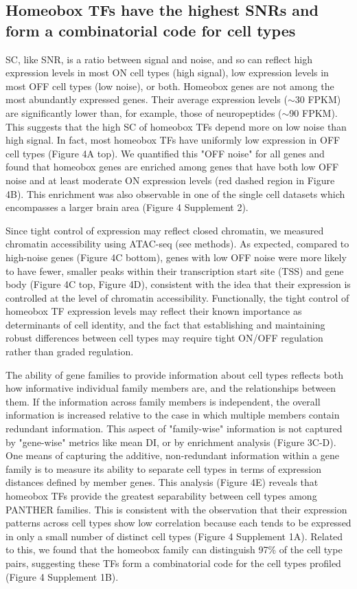 \subsection{Homeobox TFs have the highest SNRs and form a combinatorial code for cell types}
SC, like SNR, is a ratio between signal and noise, and so can reflect high expression levels in most ON cell types (high signal), low expression levels in most OFF cell types (low noise), or both. Homeobox genes are not among the most abundantly expressed genes. Their average expression levels ($\sim$30 FPKM) are significantly lower than, for example, those of neuropeptides ($\sim$90 FPKM). This suggests that the high SC of homeobox TFs depend more on low noise than high signal. In fact, most homeobox TFs have uniformly low expression in OFF cell types (Figure 4A top). We quantified this "OFF noise" for all genes and found that homeobox genes are enriched among genes that have both low OFF noise and at least moderate ON expression levels (red dashed region in Figure 4B). This enrichment was also observable in one of the single cell datasets which encompasses a larger brain area (Figure 4 Supplement 2). 

Since tight control of expression may reflect closed chromatin, we measured chromatin accessibility using ATAC-seq (see methods). As expected, compared to high-noise genes (Figure 4C bottom), genes with low OFF noise were more likely to have fewer, smaller peaks within their transcription start site (TSS) and gene body (Figure 4C top, Figure 4D), consistent with the idea that their expression is controlled at the level of chromatin accessibility. Functionally, the tight control of homeobox TF expression levels may reflect their known importance as determinants of cell identity, and the fact that establishing and maintaining robust differences between cell types may require tight ON/OFF regulation rather than graded regulation.

The ability of gene families to provide information about cell types reflects both how informative individual family members are, and the relationships between them. If the information across family members is independent, the overall information is increased relative to the case in which multiple members contain redundant information. This aspect of "family-wise" information is not captured by "gene-wise" metrics like mean DI, or by enrichment analysis (Figure 3C-D). One means of capturing the additive, non-redundant information within a gene family is to measure its ability to separate cell types in terms of expression distances defined by member genes. This analysis (Figure 4E) reveals that homeobox TFs provide the greatest separability between cell types among PANTHER families. This is consistent with the observation that their expression patterns across cell types show low correlation because each tends to be expressed in only a small number of distinct cell types (Figure 4 Supplement 1A). Related to this, we found that the homeobox family can distinguish 97\% of the cell type pairs, suggesting these TFs form a combinatorial code for the cell types profiled (Figure 4 Supplement 1B). 

